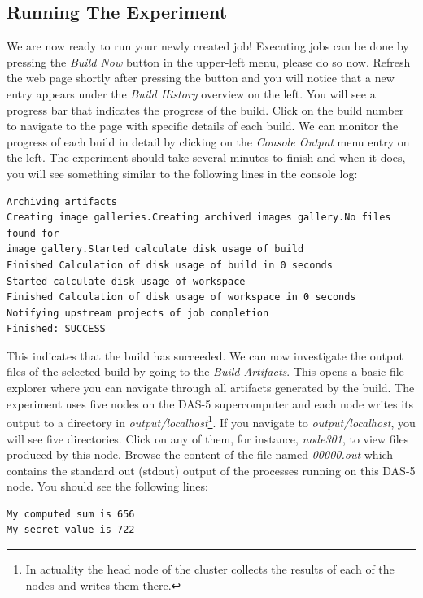 \documentclass{article}
\begin{document}
\subsection{Running The Experiment}
We are now ready to run your newly created job!
Executing jobs can be done by pressing the \emph{Build Now} button in the upper-left menu, please do so now.
Refresh the web page shortly after pressing the button and you will notice that a new entry appears under the \emph{Build History} overview on the left.
You will see a progress bar that indicates the progress of the build.
Click on the build number to navigate to the page with specific details of each build.
We can monitor the progress of each build in detail by clicking on the \emph{Console Output} menu entry on the left.
The experiment should take several minutes to finish and when it does, you will see something similar to the following lines in the console log:

\begin{lstlisting}[frame=single]  % Start your code-block
Archiving artifacts
Creating image galleries.Creating archived images gallery.No files found for
image gallery.Started calculate disk usage of build
Finished Calculation of disk usage of build in 0 seconds
Started calculate disk usage of workspace
Finished Calculation of disk usage of workspace in 0 seconds
Notifying upstream projects of job completion
Finished: SUCCESS
\end{lstlisting}

This indicates that the build has succeeded.
We can now investigate the output files of the selected build by going to the \emph{Build Artifacts}.
This opens a basic file explorer where you can navigate through all artifacts generated by the build.
The experiment uses five nodes on the DAS-5 supercomputer and each node writes its output to a directory in \emph{output/localhost}\footnote{In actuality the head node of the cluster collects the results of each of the nodes and writes them there.}.
If you navigate to \emph{output/localhost}, you will see five directories.
Click on any of them, for instance, \emph{node301}, to view files produced by this node.
Browse the content of the file named \emph{00000.out} which contains the standard out (stdout) output of the processes running on this DAS-5 node.
You should see the following lines:

\begin{lstlisting}[frame=single]
My computed sum is 656
My secret value is 722
\end{lstlisting}
\end{document}
